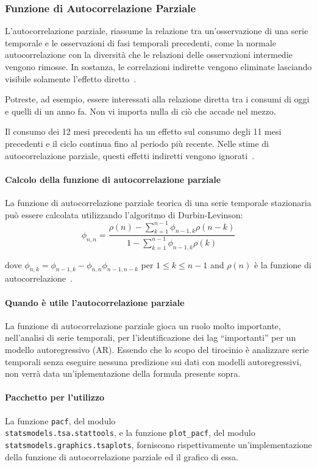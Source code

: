 \subsubsection{Funzione di Autocorrelazione Parziale}
L'autocorrelazione parziale, riassume la relazione tra 
un'osservazione di una serie temporale e le osservazioni di fasi temporali precedenti,
come la normale autocorrelazione con la diversità che le relazioni 
delle osservazioni intermedie vengono rimosse. In sostanza, 
le correlazioni indirette vengono eliminate lasciando visibile solamente
l'effetto diretto~\cite{md:mediumacf_pacf}.

Potreste, ad esempio, essere interessati alla relazione diretta tra i consumi 
di oggi e quelli di un anno fa. Non vi importa nulla di ciò che accade nel mezzo.

Il consumo dei 12 mesi precedenti ha un effetto sul consumo degli 11 mesi precedenti 
e il ciclo continua fino al periodo più recente. Nelle stime di autocorrelazione parziale, 
questi effetti indiretti vengono ignorati~\cite{ain:acf_pacf}.

\paragraph{Calcolo della funzione di autocorrelazione parziale}
La funzione di autocorrelazione parziale teorica di una serie temporale 
stazionaria può essere calcolata utilizzando l'algoritmo di Durbin-Levinson:
\[ \phi_{n,n} = 
\frac
{\rho(n) - \sum_{k = 1}^{n-1}  \phi_{n-1,k}\rho(n-k)}
{1 - \sum_{k = 1}^{n-1} \phi_{n-1,k}\rho(k)} 
\]
    
dove $\phi_{n,k} = \phi_{n-1,k} - \phi_{n,n}\phi_{n-1,n-k}$ per $1 \leq k \leq n-1$ and
$\rho(n)$ è la funzione di autocorrelazione~\cite{wiki:pacf}.

\paragraph{Quando è utile l'autocorrelazione parziale}
La funzione di autocorrelazione parziale gioca un ruolo molto importante, nell'analisi
di serie temporali, per l'identificazione dei lag ``importanti'' per un modello autoregressivo
(AR). Essendo che lo scopo del tirocinio è analizzare 
serie temporali senza eseguire nessuna predizione sui dati con modelli autoregressivi, non verrà
data un'iplementazione della formula presente sopra.

\paragraph{Pacchetto per l'utilizzo}
La funzione \texttt{pacf}, del modulo\\ \texttt{statsmodels.tsa.stattools}, e la funzione
\texttt{plot\_pacf}, del modulo\\ \texttt{statsmodels.graphics.tsaplots}, forniscono rispettivamente
un'implementazione della funzione di autocorrelazione parziale ed il grafico di essa.



